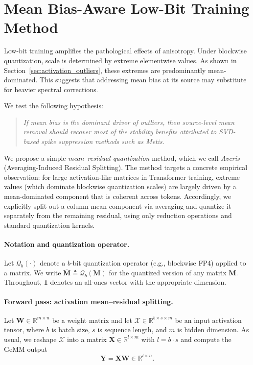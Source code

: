 \section{Mean Bias-Aware Low-Bit Training Method}
\label{sec:lowbit_pilot}
\label{sec:lowbit_method}

Low-bit training amplifies the pathological effects of anisotropy.
Under blockwise quantization, scale is determined by extreme elementwise values.
As shown in Section~\ref{sec:activation_outliers},
these extremes are predominantly mean-dominated.
This suggests that addressing mean bias at its source may substitute
for heavier spectral corrections.


We test the following hypothesis:
\begin{quote}
\emph{If mean bias is the dominant driver of outliers,
then source-level mean removal should recover most of the stability
benefits attributed to SVD-based spike suppression methods such as Metis.}
\end{quote}

We propose a simple \emph{mean--residual quantization} method, which we call
\emph{Averis} (Averaging-Induced Residual Splitting).
The method targets a concrete empirical observation: for large activation-like matrices in Transformer
training, extreme values (which dominate blockwise quantization scales) are largely driven by a
mean-dominated component that is coherent across tokens.
Accordingly, we explicitly split out a column-mean component via averaging and quantize it separately
from the remaining residual, using only reduction operations and standard quantization kernels.

\paragraph{Notation and quantization operator.}
Let $\mathcal{Q}_b(\cdot)$ denote a $b$-bit quantization operator (e.g., blockwise FP4) applied to a matrix.
We write $\bar{\mathbf{M}}\triangleq \mathcal{Q}_b(\mathbf{M})$ for the quantized version of any matrix
$\mathbf{M}$.
Throughout, $\mathbf{1}$ denotes an all-ones vector with the appropriate dimension.

\paragraph{Forward pass: activation mean--residual splitting.}
Let $\mathbf{W}\in\mathbb{R}^{m\times n}$ be a weight matrix and let
$\mathcal{X}\in\mathbb{R}^{b\times s\times m}$ be an input activation tensor, where $b$ is batch size,
$s$ is sequence length, and $m$ is hidden dimension.
As usual, we reshape $\mathcal{X}$ into a matrix $\mathbf{X}\in\mathbb{R}^{l\times m}$ with $l=b\cdot s$
and compute the GeMM output
\[
\mathbf{Y}=\mathbf{X}\mathbf{W}\in\mathbb{R}^{l\times n}.
\]

